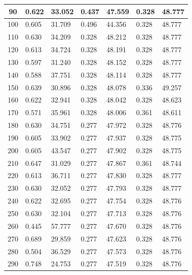 \documentclass{report}
\begin{document}
\begin{minipage}{\textwidth}
\begin{longtable}{|c|l|l|l|l|l|l|}
                     90 & 0.622 & 33.052 & 0.437 & 47.559 & 0.328 & 48.777 \\ \hline
                     100 & 0.605 & 31.709 & 0.496 & 44.356 & 0.328 & 48.777 \\ \hline
                     110 & 0.630 & 34.209 & 0.328 & 48.212 & 0.328 & 48.777 \\ \hline
                     120 & 0.613 & 34.724 & 0.328 & 48.191 & 0.328 & 48.777 \\ \hline
                     130 & 0.597 & 31.240 & 0.328 & 48.152 & 0.328 & 48.777 \\ \hline
                     140 & 0.588 & 37.751 & 0.328 & 48.114 & 0.328 & 48.777 \\ \hline
                     150 & 0.639 & 30.896 & 0.328 & 48.078 & 0.336 & 49.257 \\ \hline
                     160 & 0.622 & 32.941 & 0.328 & 48.042 & 0.328 & 48.623 \\ \hline
                     170 & 0.571 & 35.961 & 0.328 & 48.006 & 0.361 & 48.611 \\ \hline
                     180 & 0.630 & 34.751 & 0.277 & 47.972 & 0.328 & 48.776 \\ \hline
                     190 & 0.605 & 33.902 & 0.277 & 47.937 & 0.328 & 48.775 \\ \hline
                     200 & 0.605 & 43.547 & 0.277 & 47.902 & 0.328 & 48.775 \\ \hline
                     210 & 0.647 & 31.029 & 0.277 & 47.867 & 0.361 & 48.744 \\ \hline
                     220 & 0.613 & 36.711 & 0.277 & 47.830 & 0.328 & 48.777 \\ \hline
                     230 & 0.630 & 32.052 & 0.277 & 47.793 & 0.328 & 48.777 \\ \hline
                     240 & 0.622 & 32.695 & 0.277 & 47.754 & 0.328 & 48.776 \\ \hline
                     250 & 0.630 & 32.104 & 0.277 & 47.713 & 0.328 & 48.776 \\ \hline
                     260 & 0.445 & 57.777 & 0.277 & 47.670 & 0.328 & 48.776 \\ \hline
                     270 & 0.689 & 29.859 & 0.277 & 47.623 & 0.328 & 48.776 \\ \hline
                     280 & 0.504 & 36.529 & 0.277 & 47.573 & 0.328 & 48.776 \\ \hline
                     290 & 0.748 & 24.753 & 0.277 & 47.519 & 0.328 & 48.776 \\ \hline

\end{longtable}
\end{minipage}
\end{document}

